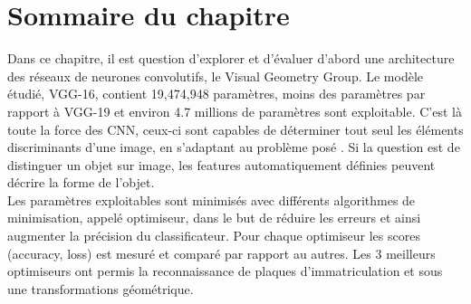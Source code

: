 	
	
	
	
	
	\section{Sommaire du chapitre}
	Dans ce chapitre, il est question d'explorer et d’évaluer d'abord une architecture des réseaux de neurones convolutifs, le Visual Geometry Group. Le modèle étudié, VGG-16, contient 19,474,948 paramètres, moins des paramètres par rapport à VGG-19   et environ 4.7 millions de paramètres sont exploitable. C’est là toute la force des CNN, ceux-ci sont capables de déterminer tout seul les éléments discriminants d'une image, en s'adaptant au problème posé \cite{shin2016deep}. Si la question est de distinguer un objet sur image, les features automatiquement définies peuvent décrire la forme de l'objet.\\
	Les paramètres exploitables sont minimisés avec différents algorithmes de minimisation, appelé optimiseur, dans le but de réduire les erreurs et ainsi augmenter la précision du classificateur. Pour chaque optimiseur les scores (accuracy, loss) est mesuré et comparé par rapport au autres. Les  3 meilleurs optimiseurs ont permis la reconnaissance de plaques d’immatriculation et sous une transformations géométrique.
	
	

